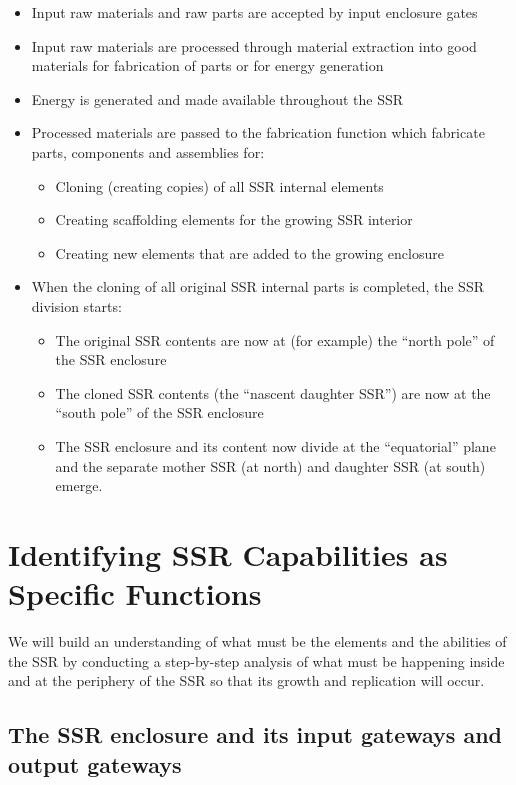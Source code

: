 \begin{itemize}
\item Input raw materials and raw parts are accepted by input enclosure
gates
\item Input raw materials are processed through material extraction into
good materials for fabrication of parts or for energy generation
\item Energy is generated and made available throughout the SSR
\item Processed materials are passed to the fabrication function which fabricate parts, components and
assemblies for: 

\begin{itemize}
\item Cloning (creating copies) of all SSR internal elements
\item Creating scaffolding elements for the growing SSR interior
\item Creating new elements that are added to the growing enclosure
\end{itemize}
\item When the cloning of all original SSR internal parts is completed,
the SSR division starts:

\begin{itemize}
\item The original SSR contents are now at (for example) the “north pole”
of the SSR enclosure
\item The cloned SSR contents (the “nascent daughter SSR”) are now at the
“south pole” of the SSR enclosure
\item The SSR enclosure and its content now divide at the “equatorial”
plane and the separate mother SSR (at north) and daughter SSR (at south)
emerge.
\end{itemize}
\end{itemize}

\section{Identifying SSR Capabilities as Specific Functions}

We will build an
understanding of what must be the elements and the abilities of the
SSR by conducting a step-by-step analysis of what must be happening inside and at
the periphery of the SSR so that its growth and replication will occur.

\subsection[The SSR enclosure and its input gateways and output
gateways]{The SSR enclosure and its input gateways and output gateways}

